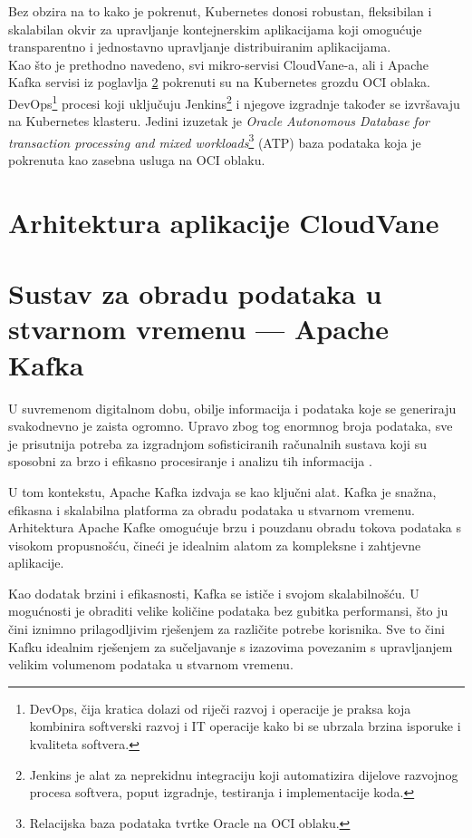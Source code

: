 \documentclass[times, utf8, diplomski]{fer}
\begin{document}
Bez obzira na to kako je pokrenut, Kubernetes donosi robustan, fleksibilan i skalabilan okvir za upravljanje kontejnerskim aplikacijama koji omogućuje transparentno i jednostavno upravljanje distribuiranim aplikacijama. \\

Kao što je prethodno navedeno, svi mikro-servisi CloudVane-a, ali i Apache Kafka servisi iz poglavlja  \ref{sec:kafka} pokrenuti su na Kubernetes grozdu OCI oblaka. DevOps\footnote{DevOps, čija kratica dolazi od riječi razvoj i operacije  je praksa koja kombinira softverski razvoj i IT operacije kako bi se ubrzala brzina isporuke i kvaliteta softvera\citep{courtemanche_what_nodate}.} procesi koji uključuju Jenkins\footnote{Jenkins je alat za neprekidnu integraciju koji automatizira dijelove razvojnog procesa softvera, poput izgradnje, testiranja i implementacije koda.} i njegove izgradnje  također se izvršavaju na Kubernetes klasteru. Jedini izuzetak je \emph{Oracle Autonomous Database for transaction processing and mixed workloads}\footnote{Relacijska baza podataka tvrtke Oracle na OCI oblaku.} (ATP) baza podataka koja je pokrenuta kao zasebna usluga na OCI oblaku.

\section{Arhitektura aplikacije CloudVane}
\label{sec:architecture}



\section{Sustav za obradu podataka u stvarnom vremenu --- Apache Kafka}
\label{sec:kafka}

U suvremenom digitalnom dobu, obilje informacija i podataka koje se generiraju svakodnevno je zaista ogromno. Upravo zbog tog enormnog broja podataka, sve je prisutnija potreba za izgradnjom sofisticiranih računalnih sustava koji su sposobni za brzo i efikasno procesiranje i analizu tih informacija \citep{cubek_apache_2022}.

U tom kontekstu, Apache Kafka izdvaja se kao ključni alat. Kafka je snažna, efikasna i skalabilna platforma za obradu podataka u stvarnom vremenu. Arhitektura Apache Kafke omogućuje brzu i pouzdanu obradu tokova podataka s visokom propusnošću, čineći je idealnim alatom za kompleksne i zahtjevne aplikacije.

Kao dodatak brzini i efikasnosti, Kafka se ističe i svojom skalabilnošću. U mogućnosti je obraditi velike količine podataka bez gubitka performansi, što ju čini iznimno prilagodljivim rješenjem za različite potrebe korisnika. Sve to čini Kafku idealnim rješenjem za sučeljavanje s izazovima povezanim s upravljanjem velikim volumenom podataka u stvarnom vremenu.
\end{document}
